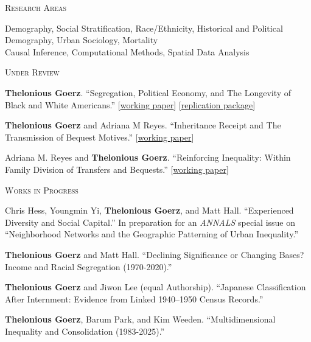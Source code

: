 \documentclass[10pt, letterpaper]{article}
\newenvironment{sectionbody}
  {\begin{list}{}{\setlength{\leftmargin}{50pt}\setlength{\topsep}{2pt}\setlength{\partopsep}{0pt}}\item[]}
  {\end{list}}
\newcommand{\sectionheading}[1]{%
  \vspace{0.5em}
  \noindent
  \makebox[0pt][l]{\rule[-.5\baselineskip]{\linewidth}{.1mm}}%
  \textsc{#1}\par\nobreak
  \vspace{0.4em}
}
\begin{document}
\sectionheading{Research Areas}
\begin{sectionbody}
 Demography, Social Stratification, Race/Ethnicity, Historical and Political Demography, Urban Sociology, Mortality\\
 Causal Inference, Computational Methods, Spatial Data Analysis
\end{sectionbody}
\sectionheading{Under Review}
\begin{sectionbody}
\textbf{Thelonious Goerz}. ``Segregation, Political Economy, and The Longevity of Black and White Americans.'' [\href{https://osf.io/preprints/socarxiv/gys4t_v3}{working paper}] [\href{https://github.com/theloniousgoerz/bw_segregation_longevity}{replication package}]

\textbf{Thelonious Goerz} and Adriana M Reyes. ``Inheritance Receipt and The Transmission of Bequest Motives.'' [\href{https://osf.io/preprints/socarxiv/sptke_v1}{working paper}]

Adriana M. Reyes and \textbf{Thelonious Goerz}. ``Reinforcing Inequality: Within Family Division of Transfers and Bequests.'' [\href{https://osf.io/preprints/socarxiv/erthf_v1}{working paper}]

\end{sectionbody}

\sectionheading{Works in Progress}
\begin{sectionbody}

Chris Hess, Youngmin Yi, \textbf{Thelonious Goerz}, and Matt Hall. ``Experienced Diversity and Social Capital.'' In preparation for an \textit{ANNALS} special issue on ``Neighborhood Networks and the Geographic Patterning of Urban Inequality.''

\textbf{Thelonious Goerz} and Matt Hall. ``Declining Significance or Changing Bases? Income and Racial Segregation (1970-2020).''

\textbf{Thelonious Goerz} and Jiwon Lee (equal Authorship). ``Japanese Classification After Internment: Evidence from Linked 1940–1950 Census Records.''

\textbf{Thelonious Goerz}, Barum Park, and Kim Weeden. ``Multidimensional Inequality and Consolidation (1983-2025).''
\end{sectionbody}
\end{document}
